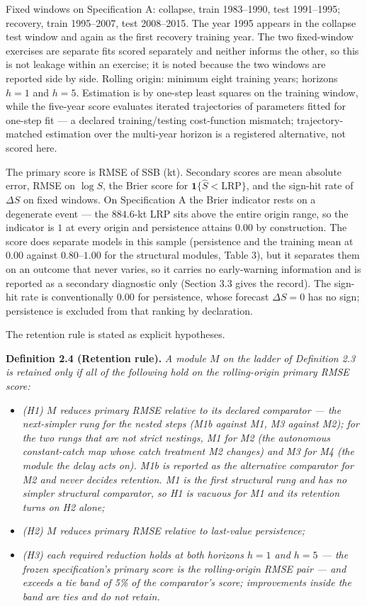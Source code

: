 \documentclass[11pt]{article}
\providecommand{\tightlist}{\setlength{\itemsep}{0pt}\setlength{\parskip}{0pt}}
\begin{document}
Fixed windows on Specification A: collapse, train 1983--1990, test
1991--1995; recovery, train 1995--2007, test 2008--2015. The year 1995
appears in the collapse test window and again as the first recovery
training year. The two fixed-window exercises are separate fits scored
separately and neither informs the other, so this is not leakage within
an exercise; it is noted because the two windows are reported side by
side. Rolling origin:
minimum eight training years; horizons \(h=1\) and \(h=5\). Estimation
is by one-step least squares on the training window, while the five-year
score evaluates iterated trajectories of parameters fitted for one-step
fit --- a declared training/testing cost-function mismatch;
trajectory-matched estimation over the multi-year horizon is a
registered alternative, not scored here.

The primary score is RMSE of SSB (kt). Secondary scores are mean
absolute error, RMSE on \(\log S\), the Brier score for
\(\mathbf{1}\{\hat S<\mathrm{LRP}\}\), and the sign-hit rate of
\(\Delta S\) on fixed windows. On Specification A the Brier indicator
rests on a degenerate event --- the \(884.6\)-kt LRP sits above the
entire origin range, so the indicator is \(1\) at every origin and
persistence attains \(0.00\) by construction. The score does separate
models in this sample (persistence and the training mean at \(0.00\)
against \(0.80\)--\(1.00\) for the structural modules, Table 3), but it
separates them on an outcome that never varies, so it carries no
early-warning information and is reported as a secondary diagnostic only
(Section 3.3 gives the record). The
sign-hit rate is conventionally \(0.00\) for persistence, whose forecast
\(\Delta S = 0\) has no sign; persistence is excluded from that ranking
by declaration.

The retention rule is stated as explicit hypotheses.

\textbf{Definition 2.4 (Retention rule).} \emph{A module \(M\) on the
ladder of Definition 2.3 is retained only if all of the following hold
on the rolling-origin primary RMSE score:}

\begin{itemize}
\tightlist
\item
  \emph{(H1) \(M\) reduces primary RMSE relative to its declared
  comparator --- the next-simpler rung for the nested steps (M1b against
  M1, M3 against M2); for the two rungs that are not strict nestings, M1
  for M2 (the autonomous constant-catch map whose catch treatment M2
  changes) and M3 for M4 (the module the delay acts on). M1b is reported
  as the alternative comparator for M2 and never decides retention. M1
  is the first structural rung and has no simpler structural comparator,
  so H1 is vacuous for M1 and its retention turns on H2 alone;}
\item
  \emph{(H2) \(M\) reduces primary RMSE relative to last-value
  persistence;}
\item
  \emph{(H3) each required reduction holds at both horizons \(h=1\) and
  \(h=5\) --- the frozen specification's primary score is the
  rolling-origin RMSE pair --- and exceeds a tie band of 5\% of the
  comparator's score; improvements inside the band are ties and do not
  retain.}
\end{itemize}
\end{document}
